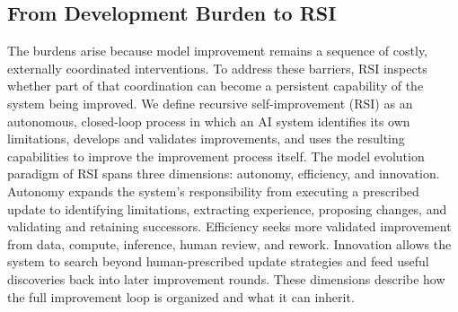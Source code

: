




\subsection{From Development Burden to RSI}

The burdens arise because model improvement remains a sequence of costly, externally coordinated interventions. To address these barriers, RSI inspects whether part of that coordination can become a persistent capability of the system being improved. We define recursive self-improvement (RSI) as an autonomous, closed-loop process in which an AI system identifies its own limitations, develops and validates improvements, and uses the resulting capabilities to improve the improvement process itself. The model evolution paradigm of RSI spans three dimensions: autonomy, efficiency, and innovation. Autonomy expands the system's responsibility from executing a prescribed update to identifying limitations, extracting experience, proposing changes, and validating and retaining successors. Efficiency seeks more validated improvement from data, compute, inference, human review, and rework. Innovation allows the system to search beyond human-prescribed update strategies and feed useful discoveries back into later improvement rounds. These dimensions describe how the full improvement loop is organized and what it can inherit.


